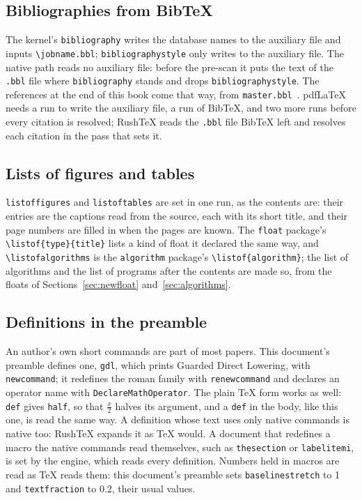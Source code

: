 \documentclass{article}
\numberwithin{equation}{section}
\newcommand{\gdl}{Guarded Direct Lowering}
\def\half#1{\frac{#1}{2}}
\theoremstyle{definition}
\theoremstyle{remark}
\begin{document}
\subsection{Bibliographies from BibTeX}
The kernel's \texttt{bibliography} writes the database names to the auxiliary file and
inputs \texttt{\textbackslash jobname.bbl}; \texttt{bibliographystyle} only writes to the
auxiliary file. The native path reads no auxiliary file: before the pre-scan it puts the
text of the \texttt{.bbl} file where \texttt{bibliography} stands and drops
\texttt{bibliographystyle}. The references at the end of this book come that way, from
\texttt{master.bbl}~\cite{knuth86}. pdfLaTeX needs a run to write the auxiliary file,
a run of BibTeX, and two more runs before every citation is resolved; RushTeX reads the
\texttt{.bbl} file BibTeX left and resolves each citation in the pass that sets it.

\subsection{Lists of figures and tables}\label{sec:floatlists}
\texttt{listoffigures} and \texttt{listoftables} are set in one run, as the contents are:
their entries are the captions read from the source, each with its short title, and their
page numbers are filled in when the pages are known. The \texttt{float} package's
\verb|\listof{type}{title}| lists a kind of float it declared the same way, and
\verb|\listofalgorithms| is the \texttt{algorithm} package's \verb|\listof{algorithm}|; the
list of algorithms and the list of programs after the contents are made so, from the
floats of Sections~\ref{sec:newfloat} and~\ref{sec:algorithms}.

\subsection{Definitions in the preamble}

An author's own short commands are part of most papers. This document's preamble
defines one, \texttt{gdl}, which prints \gdl, with \texttt{newcommand}; it redefines the
roman family with \texttt{renewcommand} and declares an operator name with
\texttt{DeclareMathOperator}. The plain \TeX{} form works as well: \texttt{def} gives
\texttt{half}, so that $\half{x}$ halves its argument, and a \texttt{def} in the body,
\def\gdlnote{like this one}\gdlnote, is read the same way. A definition whose text uses
only native commands is native too: RushTeX expands it as \TeX{} would. A document that
redefines a macro the native commands read themselves, such as \texttt{thesection} or
\texttt{labelitemi}, is set by the engine, which reads every definition. Numbers held in
macros are read as \TeX{} reads them: this document's preamble sets
\texttt{baselinestretch} to 1 and \texttt{textfraction} to 0.2, their usual values.
\end{document}

